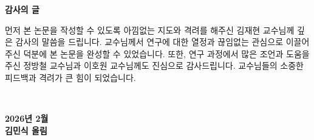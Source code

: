 \thispagestyle{empty}
\begin{center}
    \Large\textbf{감사의 글}
\end{center}

\vspace{2em} %

먼저 본 논문을 작성할 수 있도록 아낌없는 지도와 격려를 해주신 김재현 교수님께 깊은 감사의 말씀을 드립니다. 교수님께서 연구에 대한 열정과 끊임없는 관심으로 이끌어 주신 덕분에 본 논문을 완성할 수 있었습니다. 또한, 연구 과정에서 많은 조언과 도움을 주신 정방철 교수님과 이호원 교수님께도 진심으로 감사드립니다. 교수님들의 소중한 피드백과 격려가 큰 힘이 되었습니다.

\textcolor{white}{ㅇㅇ}
\quad 
\vspace{2cm} %

\begin{flushright}
\textbf{2026년 2월}\\
\textbf{김민식 올림}
\end{flushright}